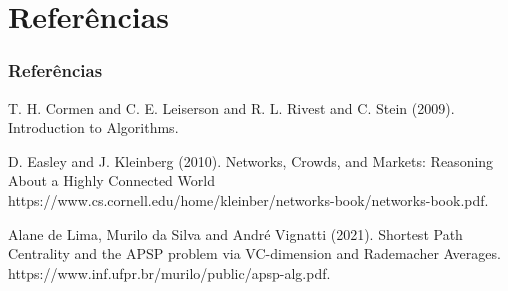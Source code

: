 \documentclass{beamer}
\begin{document}
\section{Referências}
    \begin{frame}[t, allowframebreaks]
    \frametitle{Referências}
    \footnotesize{
        \begin{thebibliography}{99}
            \bibitem[]{} T. H. Cormen and C. E. Leiserson and R. L. Rivest and C. Stein (2009).
            \newblock Introduction to Algorithms.

            \bibitem[]{} D. Easley and J. Kleinberg (2010).
            \newblock Networks, Crowds, and Markets: Reasoning About a Highly Connected World
            \newblock https://www.cs.cornell.edu/home/kleinber/networks-book/networks-book.pdf.

            \bibitem[]{} Alane de Lima, Murilo da Silva and André Vignatti (2021).
            \newblock Shortest Path Centrality and the APSP problem via VC-dimension and Rademacher Averages.
            \newblock https://www.inf.ufpr.br/murilo/public/apsp-alg.pdf.
        \end{thebibliography}
    }
    \end{frame}
\end{document}
